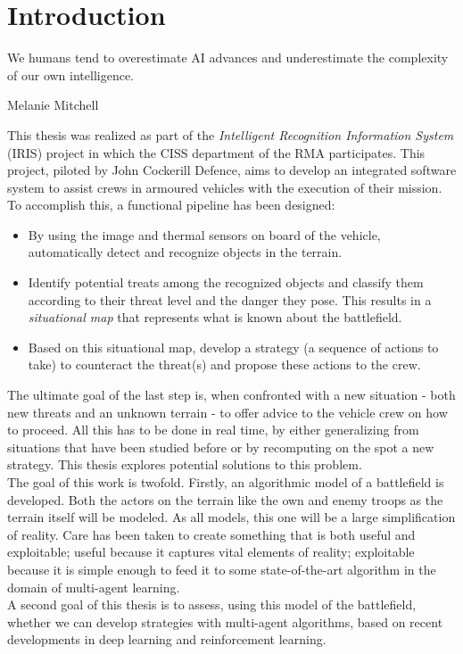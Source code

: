\chapter{Introduction}

\epigraph{We humans tend to overestimate AI advances and underestimate the complexity of our own intelligence.} {Melanie Mitchell}
This thesis was realized as part of the \emph{Intelligent Recognition Information System} (IRIS) project in which the CISS department of the RMA participates. This project, piloted by John Cockerill Defence, aims to develop an integrated software system to assist crews in armoured vehicles with the execution of their mission. To accomplish this, a functional pipeline has been designed:
\begin{itemize}
    \item By using the image and thermal sensors on board of the vehicle, automatically detect and recognize objects in the terrain.
    \item Identify potential treats among the recognized objects and classify them according to their threat level and the danger they pose. This results in a \emph{situational map} that represents what is known about the battlefield.
    \item Based on this situational map, develop a strategy (a sequence of actions to take) to counteract the threat(s) and propose these actions to the crew.
\end{itemize}
The ultimate goal of the last step is, when confronted with a new situation - both new threats and an unknown terrain - to offer advice to the vehicle crew on how to proceed. All this has to be done in real time, by either generalizing from situations that have been studied before or by recomputing on the spot a new strategy. This thesis explores potential solutions to this problem.\\
The goal of this work is twofold. Firstly, an algorithmic model of a battlefield is developed. Both the actors on the terrain like the own and enemy troops as the terrain itself will be modeled. As all models, this one will be a large simplification of reality. Care has been taken to create something that is both useful and exploitable; useful because it captures vital elements of reality; exploitable because it is simple enough to feed it to some state-of-the-art algorithm in the domain of multi-agent learning.\\
A second goal of this thesis is to assess, using this model of the battlefield, whether we can develop strategies with multi-agent algorithms, based on recent developments in deep learning and reinforcement learning.\\
